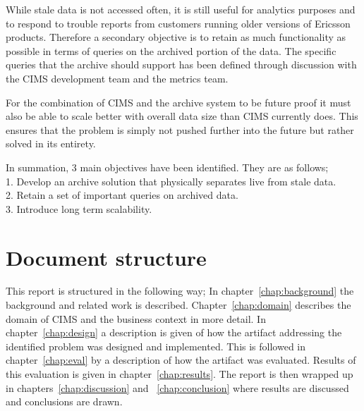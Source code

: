 While stale data is not accessed often, it is still useful for analytics purposes and to respond to trouble reports from customers running older versions of Ericsson products. Therefore a secondary objective is to retain as much functionality as possible in terms of queries on the archived portion of the data. The specific queries that the archive should support has been defined through discussion with the CIMS development team and the metrics team.

For the combination of CIMS and the archive system to be future proof it must also be able to scale better with overall data size than CIMS currently does. This ensures that the problem is simply not pushed further into the future but rather solved in its entirety.

In summation, 3 main objectives have been identified. They are as follows;\\
1. Develop an archive solution that physically separates live from stale data.\\
2. Retain a set of important queries on archived data.\\
3. Introduce long term scalability. \\


\section{Document structure}
This report is structured in the following way; In chapter~\ref{chap:background} the background and related work is described. Chapter~\ref{chap:domain} describes the domain of CIMS and the business context in more detail. In chapter~\ref{chap:design} a description is given of how the artifact addressing the identified problem was designed and implemented.
This is followed in chapter~\ref{chap:eval} by a description of how the artifact was evaluated. Results of this evaluation is given in chapter~\ref{chap:results}. The report is then wrapped up in chapters~\ref{chap:discussion} and  ~\ref{chap:conclusion} where results are discussed and conclusions are drawn.


